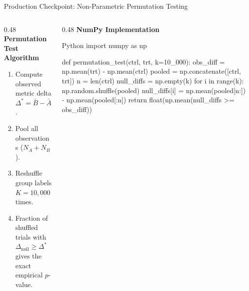 \documentclass[../m00-session-03.tex]{subfiles}
\begin{document}
\begin{frame}[fragile]{Production Checkpoint: Non-Parametric Permutation Testing}
  \begin{columns}[T,onlytextwidth]
    \begin{column}{0.48\textwidth}
      {\small\bfseries\color{UpGradNight}Permutation Test Algorithm}\par\vspace{0.06cm}
      \begin{enumerate}\setlength{\itemsep}{0.14em}\small
        \item Compute observed metric delta $\Delta^* = \bar{B} - \bar{A}$.
        \item Pool all observations ($N_A + N_B$).
        \item Reshuffle group labels $K = 10,000$ times.
        \item Fraction of shuffled trials with $\Delta_{\text{null}} \ge \Delta^*$ gives the exact empirical $p$-value.
      \end{enumerate}
      \vspace{0.04cm}
    \end{column}
    \hfill
    \begin{column}{0.48\textwidth}
      {\small\bfseries\color{UpGradRed}NumPy Implementation}\par\vspace{0.04cm}
\begin{CodeBlock}{Python}
import numpy as np

def permutation_test(ctrl, trt, k=10_000):
    obs_diff = np.mean(trt) - np.mean(ctrl)
    pooled = np.concatenate([ctrl, trt])
    n = len(ctrl)
    null_diffs = np.empty(k)
    for i in range(k):
        np.random.shuffle(pooled)
        null_diffs[i] = np.mean(pooled[n:]) - np.mean(pooled[:n])
    return float(np.mean(null_diffs >= obs_diff))
\end{CodeBlock}
    \end{column}
  \end{columns}
\end{frame}
\end{document}

